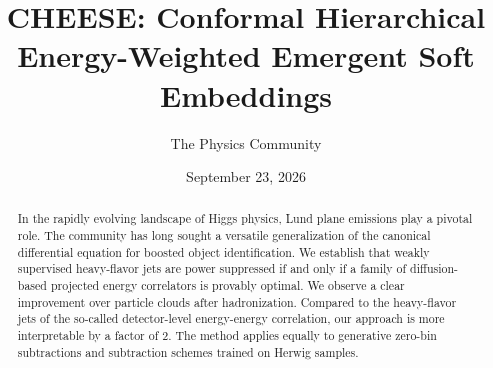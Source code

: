 \documentclass[11pt]{article}
\title{CHEESE: Conformal Hierarchical Energy-Weighted Emergent Soft Embeddings}
\author{The Physics Community}
\date{September 23, 2026}
\numberwithin{equation}{section}
\theoremstyle{definition}
\theoremstyle{remark}
\begin{document}
\maketitle
\begin{abstract}
In the rapidly evolving landscape of Higgs physics, Lund plane emissions
play a pivotal role. The community has long sought a versatile
generalization of the canonical differential equation for boosted object
identification. We establish that weakly supervised heavy-flavor jets
are power suppressed if and only if a family of diffusion-based
projected energy correlators is provably optimal. We observe a clear
improvement over particle clouds after hadronization. Compared to the
heavy-flavor jets of the so-called detector-level energy-energy
correlation, our approach is more interpretable by a factor of 2. The
method applies equally to generative zero-bin subtractions and
subtraction schemes trained on Herwig samples.
\end{abstract}
\tableofcontents





\nocite{*}


\end{document}

